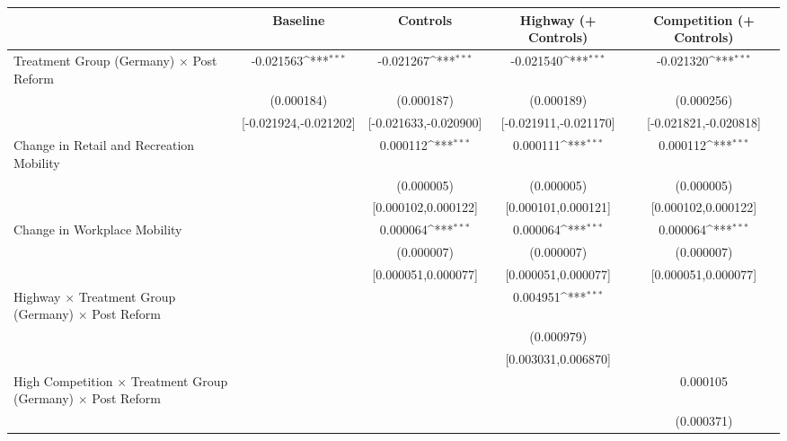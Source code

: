 {
\def\sym#1{\ifmmode^{#1}\else\(^{#1}\)\fi}
\begin{tabular}{l*{4}{c}}
\toprule
                    &\multicolumn{1}{c}{Baseline}&\multicolumn{1}{c}{Controls}&\multicolumn{1}{c}{Highway (+ Controls)}&\multicolumn{1}{c}{Competition (+ Controls)}\\
\midrule
Treatment Group (Germany) $\times$ Post Reform&   -0.021563\sym{***}&   -0.021267\sym{***}&   -0.021540\sym{***}&   -0.021320\sym{***}\\
                    &  (0.000184)         &  (0.000187)         &  (0.000189)         &  (0.000256)         \\
                    &[-0.021924,-0.021202]         &[-0.021633,-0.020900]         &[-0.021911,-0.021170]         &[-0.021821,-0.020818]         \\
Change in Retail and Recreation Mobility&                     &    0.000112\sym{***}&    0.000111\sym{***}&    0.000112\sym{***}\\
                    &                     &  (0.000005)         &  (0.000005)         &  (0.000005)         \\
                    &                     &[0.000102,0.000122]         &[0.000101,0.000121]         &[0.000102,0.000122]         \\
Change in Workplace Mobility&                     &    0.000064\sym{***}&    0.000064\sym{***}&    0.000064\sym{***}\\
                    &                     &  (0.000007)         &  (0.000007)         &  (0.000007)         \\
                    &                     &[0.000051,0.000077]         &[0.000051,0.000077]         &[0.000051,0.000077]         \\
Highway $\times$ Treatment Group (Germany) $\times$ Post Reform&                     &                     &    0.004951\sym{***}&                     \\
                    &                     &                     &  (0.000979)         &                     \\
                    &                     &                     &[0.003031,0.006870]         &                     \\
High Competition $\times$ Treatment Group (Germany) $\times$ Post Reform&                     &                     &                     &    0.000105         \\
                    &                     &                     &                     &  (0.000371)         \\

\end{tabular}}
